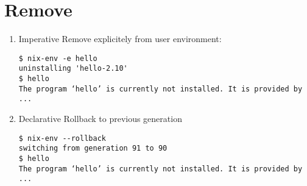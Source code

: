 \documentclass[smaller]{beamer}
\begin{document}
\section{Remove}
\label{sec:orgbfd830a}
\begin{enumerate}
\item Imperative
\label{sec:org6895ab4}
Remove explicitely from user environment:\\

\begin{verbatim}
$ nix-env -e hello
uninstalling 'hello-2.10'
$ hello
The program ‘hello’ is currently not installed. It is provided by
...
\end{verbatim}

\item Declarative
\label{sec:orgc39a926}
Rollback to previous generation\\

\begin{verbatim}
$ nix-env --rollback
switching from generation 91 to 90
$ hello
The program ‘hello’ is currently not installed. It is provided by
...
\end{verbatim}
\end{enumerate}
\end{document}
